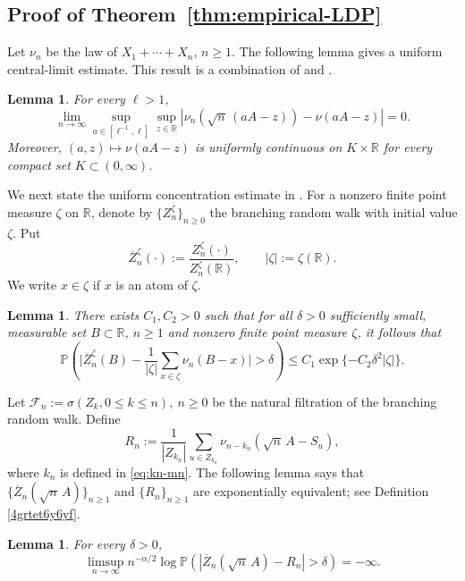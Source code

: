 \documentclass[a4paper, 11pt]{article}
\newcommand{\1}{\mathbf 1}
\theoremstyle{plain}
\newtheorem{lemma}[theorem]{Lemma}
\begin{document}
\subsection{Proof of Theorem~\ref{thm:empirical-LDP}}

Let \(\nu_n\) be the law of \(X_1+\cdots+X_n\), $n\geq1$. The following lemma gives
a uniform central-limit estimate. This result is a combination of
\cite[Lemma~2.2]{LouidorPerkins2015} and \cite[Lemma 2.1 (i)]{ChenHe2019}.

\begin{lemma}
\label{lem:uniform-CLT}
For every \(\ell>1\),
\begin{equation}
  \lim_{n\to\infty}
  \sup_{a\in[\ell^{-1},\ell]}\sup_{z\in\mathbb{R}}
  \left|
    \nu_n\!\left(\sqrt n\,(aA-z)\right)-\nu(aA-z)
  \right|
  =0.\nonumber
\end{equation}
Moreover, \((a,z)\mapsto\nu(aA-z)\) is uniformly continuous on $K\times \mathbb{R}$ for every compact set $K\subset(0,\infty)$.
\end{lemma}



We next state the uniform concentration
estimate in \cite[Lemma~2.4]{LouidorPerkins2015}. For a nonzero finite point measure \(\zeta\) on \(\mathbb{R}\), denote by $\{Z_n^{\zeta}\}_{n\geq0}$ the branching random walk with initial value $\zeta.$ Put
\[
  \overline Z_n^\zeta(\cdot)
  :=\frac{Z_n^\zeta(\cdot)}{Z^{\zeta}_n(\mathbb{R})},
  \qquad |\zeta|:=\zeta(\mathbb{R}).
\]
We write $x\in\zeta$ if $x$ is an atom of $\zeta.$
\begin{lemma}
\label{lem:finite-configuration-concentration}
There exists $C_1,C_2>0$ such that for all $\delta>0$ sufficiently small, measurable set \(B\subset\mathbb{R}\), \(n\geq1\) and
nonzero finite point measure \(\zeta\), it follows that
\[
  \mathbb{P}\!\left(
    \Bigg|
      \overline Z_n^\zeta(B)
      -\frac1{|\zeta|}\sum_{x\in\zeta}\nu_n(B-x)
    \Bigg|>\delta
  \right)
  \leq C_1\exp\{-C_2\delta^2|\zeta|\}.
\]
\end{lemma}
Let \(\mathcal{F}_{n}:=\sigma(Z_k,0\leq k\leq n),~n\geq0\) be the natural filtration of the branching random walk. Define
\begin{equation}
  R_n
  :=
  \frac{1}{|Z_{k_n}|}\sum_{u\in Z_{k_n}}
  \nu_{n-k_n}\!\left(\sqrt n\,A-S_u\right),
\end{equation}
where $k_n$ is defined in \eqref{eq:kn-mn}. The following lemma says that $\{\overline Z_n(\sqrt n\,A)\}_{n\geq1}$ and $\{R_n\}_{n\geq1}$ are exponentially equivalent; see Definition \ref{4grtet6y6yf}.
\begin{lemma}\label{lem:conditional-concentration}
For every \(\delta>0\),
\[
  \limsup_{n\to\infty}n^{-\alpha/2}
  \log\mathbb{P}\!\left(
    \left|\overline Z_n(\sqrt n\,A)-R_n\right|>\delta
  \right)
  =-\infty.
\]
\end{lemma}
\end{document}
